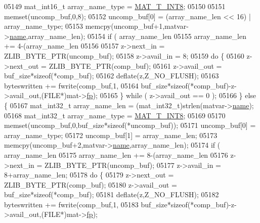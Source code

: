 \begin{DoxyCode}
{{{{{{{{{{{{{{{{{{{{{{{{{{{{{{{05149             mat\_int16\_t array\_name\_type = \hyperlink{group___m_a_t_ggacf7b3b879282b7ab3a51190e49bf3453a9807f5033ed4f9b548953742d9fd1658}{MAT\_T\_INT8};
05150 
05151             memset(uncomp\_buf,0,8);
05152             uncomp\_buf[0] = (array\_name\_len << 16) | array\_name\_type;
05153             memcpy(uncomp\_buf+1,matvar->\hyperlink{group___m_a_t_a5d4b55b041e3b4fb50c04337f05ad909}{name},array\_name\_len);
05154             \textcolor{keywordflow}{if} ( array\_name\_len %
05155                 array\_name\_len += 4-(array\_name\_len %
05156 
05157             z->next\_in  = ZLIB\_BYTE\_PTR(uncomp\_buf);
05158             z->avail\_in = 8;
05159             \textcolor{keywordflow}{do} \{
05160                 z->next\_out  = ZLIB\_BYTE\_PTR(comp\_buf);
05161                 z->avail\_out = buf\_size*\textcolor{keyword}{sizeof}(*comp\_buf);
05162                 deflate(z,Z\_NO\_FLUSH);
05163                 byteswritten += fwrite(comp\_buf,1,
05164                     buf\_size*\textcolor{keyword}{sizeof}(*comp\_buf)-z->avail\_out,(FILE*)mat->\hyperlink{struct__mat__t_a85f562e407ca9ad4d2a6e14f839432b7}{fp});
05165             \} \textcolor{keywordflow}{while} ( z->avail\_out == 0 );
05166         \} \textcolor{keywordflow}{else} \{
05167             mat\_int32\_t array\_name\_len = (mat\_int32\_t)strlen(matvar->\hyperlink{group___m_a_t_a5d4b55b041e3b4fb50c04337f05ad909}{name});
05168             mat\_int32\_t array\_name\_type = \hyperlink{group___m_a_t_ggacf7b3b879282b7ab3a51190e49bf3453a9807f5033ed4f9b548953742d9fd1658}{MAT\_T\_INT8};
05169 
05170             memset(uncomp\_buf,0,buf\_size*\textcolor{keyword}{sizeof}(*uncomp\_buf));
05171             uncomp\_buf[0] = array\_name\_type;
05172             uncomp\_buf[1] = array\_name\_len;
05173             memcpy(uncomp\_buf+2,matvar->\hyperlink{group___m_a_t_a5d4b55b041e3b4fb50c04337f05ad909}{name},array\_name\_len);
05174             \textcolor{keywordflow}{if} ( array\_name\_len %
05175                 array\_name\_len += 8-(array\_name\_len %
05176             z->next\_in  = ZLIB\_BYTE\_PTR(uncomp\_buf);
05177             z->avail\_in = 8+array\_name\_len;
05178             \textcolor{keywordflow}{do} \{
05179                 z->next\_out  = ZLIB\_BYTE\_PTR(comp\_buf);
05180                 z->avail\_out = buf\_size*\textcolor{keyword}{sizeof}(*comp\_buf);
05181                 deflate(z,Z\_NO\_FLUSH);
05182                 byteswritten += fwrite(comp\_buf,1,
05183                     buf\_size*\textcolor{keyword}{sizeof}(*comp\_buf)-z->avail\_out,(FILE*)mat->\hyperlink{struct__mat__t_a85f562e407ca9ad4d2a6e14f839432b7}{fp});
}}}}}}}}}}}}}}}}}}}}}}}}}}}}}}}
\end{DoxyCode}

